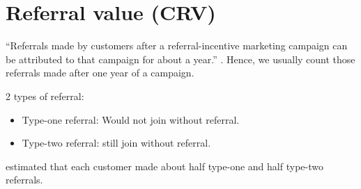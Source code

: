\documentclass[
]{book}
\newenvironment{Shaded}{\begin{snugshade}}{\end{snugshade}}
\newcommand{\AttributeTok}[1]{\textcolor[rgb]{0.77,0.63,0.00}{#1}}
\newcommand{\CommentTok}[1]{\textcolor[rgb]{0.56,0.35,0.01}{\textit{#1}}}
\newcommand{\ConstantTok}[1]{\textcolor[rgb]{0.00,0.00,0.00}{#1}}
\newcommand{\DecValTok}[1]{\textcolor[rgb]{0.00,0.00,0.81}{#1}}
\newcommand{\FunctionTok}[1]{\textcolor[rgb]{0.00,0.00,0.00}{#1}}
\newcommand{\NormalTok}[1]{#1}
\newcommand{\OtherTok}[1]{\textcolor[rgb]{0.56,0.35,0.01}{#1}}
\newcommand{\SpecialCharTok}[1]{\textcolor[rgb]{0.00,0.00,0.00}{#1}}
\newcommand{\StringTok}[1]{\textcolor[rgb]{0.31,0.60,0.02}{#1}}
\providecommand{\tightlist}{%
  \setlength{\itemsep}{0pt}\setlength{\parskip}{0pt}}
\begin{document}
\begin{Shaded}
\end{Shaded}

\hypertarget{referral-value-crv}{%
\section{Referral value (CRV)}\label{referral-value-crv}}

``Referrals made by customers after a referral-incentive marketing campaign can be attributed to that campaign for about a year.'' \citep{kumar_2007}. Hence, we usually count those referrals made after one year of a campaign.

2 types of referral:

\begin{itemize}
\tightlist
\item
  Type-one referral: Would not join without referral.\\
\item
  Type-two referral: still join without referral.
\end{itemize}

\citep{kumar_2007} estimated that each customer made about half type-one and half type-two referrals.
\end{document}
